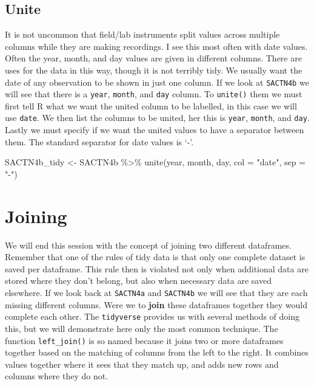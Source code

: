 \documentclass[
]{book}
\newenvironment{Shaded}{\begin{snugshade}}{\end{snugshade}}
\newcommand{\AttributeTok}[1]{\textcolor[rgb]{0.77,0.63,0.00}{#1}}
\newcommand{\FunctionTok}[1]{\textcolor[rgb]{0.00,0.00,0.00}{#1}}
\newcommand{\NormalTok}[1]{#1}
\newcommand{\OtherTok}[1]{\textcolor[rgb]{0.56,0.35,0.01}{#1}}
\newcommand{\SpecialCharTok}[1]{\textcolor[rgb]{0.00,0.00,0.00}{#1}}
\newcommand{\StringTok}[1]{\textcolor[rgb]{0.31,0.60,0.02}{#1}}
\begin{document}
\hypertarget{unite}{%
\subsection{Unite}\label{unite}}

It is not uncommon that field/lab instruments split values across multiple columns while they are making recordings. I see this most often with date values. Often the year, month, and day values are given in different columns. There are uses for the data in this way, though it is not terribly tidy. We usually want the date of any observation to be shown in just one column. If we look at \texttt{SACTN4b} we will see that there is a \texttt{year}, \texttt{month}, and \texttt{day} column. To \texttt{unite()} them we must first tell R what we want the united column to be labelled, in this case we will use \texttt{date}. We then list the columns to be united, her this is \texttt{year}, \texttt{month}, and \texttt{day}. Lastly we must specify if we want the united values to have a separator between them. The standard separator for date values is `-'.

\begin{Shaded}
\begin{Highlighting}[]
\NormalTok{SACTN4b\_tidy }\OtherTok{\textless{}{-}}\NormalTok{ SACTN4b }\SpecialCharTok{\%\textgreater{}\%} 
  \FunctionTok{unite}\NormalTok{(year, month, day, }\AttributeTok{col =} \StringTok{"date"}\NormalTok{, }\AttributeTok{sep =} \StringTok{"{-}"}\NormalTok{)}
\end{Highlighting}
\end{Shaded}

\hypertarget{joining}{%
\section{Joining}\label{joining}}

We will end this session with the concept of joining two different dataframes. Remember that one of the rules of tidy data is that only one complete dataset is saved per dataframe. This rule then is violated not only when additional data are stored where they don't belong, but also when necessary data are saved elsewhere. If we look back at \texttt{SACTN4a} and \texttt{SACTN4b} we will see that they are each missing different columns. Were we to \textbf{join} these dataframes together they would complete each other. The \texttt{tidyverse} provides us with several methods of doing this, but we will demonstrate here only the most common technique. The function \texttt{left\_join()} is so named because it joins two or more dataframes together based on the matching of columns from the left to the right. It combines values together where it sees that they match up, and adds new rows and columns where they do not.
\end{document}
